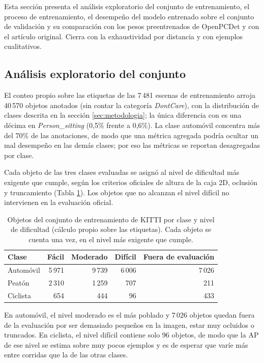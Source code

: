 \documentclass[11pt,letterpaper]{article}
\begin{document}
Esta sección presenta el análisis exploratorio del conjunto de entrenamiento, el proceso de entrenamiento, el desempeño del modelo entrenado sobre el conjunto de validación y su comparación con los pesos preentrenados de OpenPCDet y con el artículo original. Cierra con la exhaustividad por distancia y con ejemplos cualitativos.

\subsection{Análisis exploratorio del conjunto}

El conteo propio sobre las etiquetas de las 7\,481 escenas de entrenamiento arroja 40\,570 objetos anotados (sin contar la categoría \textit{DontCare}), con la distribución de clases descrita en la sección \ref{sec:metodologia}; la única diferencia con \cite{wirges2018} es una décima en \textit{Person\_sitting} (0,5\% frente a 0,6\%). La clase automóvil concentra más del 70\% de las anotaciones, de modo que una métrica agregada podría ocultar un mal desempeño en las demás clases; por eso las métricas se reportan desagregadas por clase.

Cada objeto de las tres clases evaluadas se asignó al nivel de dificultad más exigente que cumple, según los criterios oficiales de altura de la caja 2D, oclusión y truncamiento (Tabla \ref{tab:dificultad}). Los objetos que no alcanzan el nivel difícil no intervienen en la evaluación oficial.

\begin{table}[htbp]
\caption{Objetos del conjunto de entrenamiento de KITTI por clase y nivel de dificultad (cálculo propio sobre las etiquetas). Cada objeto se cuenta una vez, en el nivel más exigente que cumple.}
\label{tab:dificultad}
\centering
\small
\begin{tabular}{@{}lrrrr@{}}
\toprule
\textbf{Clase} & \textbf{Fácil} & \textbf{Moderado} & \textbf{Difícil} & \textbf{Fuera de evaluación} \\
\midrule
Automóvil & 5\,971 & 9\,739 & 6\,006 & 7\,026 \\
Peatón    & 2\,310 & 1\,259 &    707 &    211 \\
Ciclista  &    654 &    444 &     96 &    433 \\
\bottomrule
\end{tabular}
\end{table}

En automóvil, el nivel moderado es el más poblado y 7\,026 objetos quedan fuera de la evaluación por ser demasiado pequeños en la imagen, estar muy ocluidos o truncados. En ciclista, el nivel difícil contiene solo 96 objetos, de modo que la AP de ese nivel se estima sobre muy pocos ejemplos y es de esperar que varíe más entre corridas que la de las otras clases.
\end{document}
